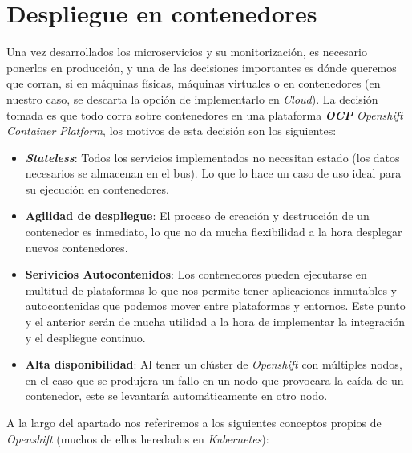 

\chapter{Despliegue en contenedores}
Una vez desarrollados los microservicios y su monitorización, es necesario ponerlos en producción, y una de las decisiones importantes es dónde queremos que corran, si en máquinas físicas, máquinas virtuales o en contenedores (en nuestro caso, se descarta la opción de implementarlo en \textit{Cloud}). La decisión tomada es que todo corra sobre contenedores en una plataforma \textit{\textbf{OCP}} \textit{Openshift Container Platform}, los motivos de esta decisión son los siguientes: 

\begin{itemize}
	\item \textit{\textbf{Stateless}}: Todos los servicios implementados no necesitan estado (los datos necesarios se almacenan en el bus). Lo que lo hace un caso de uso ideal para su ejecución en contenedores. 
	\item \textbf{Agilidad de despliegue}: El proceso de creación y destrucción de un contenedor es inmediato, lo que no da mucha flexibilidad a la hora desplegar nuevos contenedores.
	
	\item \textbf{Serivicios Autocontenidos}: Los contenedores pueden ejecutarse en multitud de plataformas lo que nos permite tener aplicaciones inmutables y autocontenidas que podemos mover entre plataformas y entornos. Este punto y el anterior serán de mucha utilidad a la hora de implementar la integración y el despliegue continuo.
	
	\item  \textbf{Alta disponibilidad}: Al tener un clúster de \textit{Openshift} con múltiples nodos, en el caso que se produjera un fallo en un nodo que provocara la caída de un contenedor, este se levantaría automáticamente en otro nodo. 
	
\end{itemize} 

A la largo del apartado nos referiremos a los siguientes conceptos propios de \textit{Openshift} (muchos de ellos heredados en \textit{Kubernetes}):

